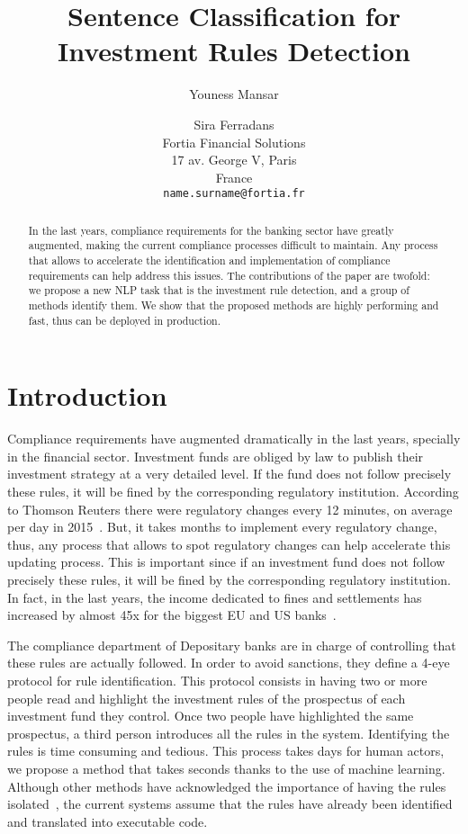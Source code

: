 \documentclass[11pt,a4paper]{article}
\title{Sentence Classification for Investment Rules Detection}
\author{Youness Mansar \and Sira Ferradans \\
  Fortia Financial Solutions   \\
  17 av. George V, Paris \\
  France \\
  {\tt name.surname@fortia.fr} 
  }
\begin{document}
\maketitle

\begin{abstract}
   In the last years, compliance requirements for the banking sector have greatly augmented, making the current compliance processes difficult to maintain. Any process that allows to accelerate the identification and implementation of compliance requirements can help address this issues. The contributions of the paper are twofold: we propose a new NLP task that is the investment rule detection, and a group of methods identify them. We show that the proposed methods are highly performing and fast, thus can be deployed in production.
\end{abstract}

\section{Introduction}

Compliance requirements have augmented dramatically in the last years, specially in the financial sector. Investment funds are obliged by law to publish their investment strategy at a very detailed level. If the fund does not follow precisely these rules, it will be fined by the corresponding regulatory institution. According to Thomson Reuters there were regulatory changes every 12 minutes, on average per day in 2015~\cite{regulatorychanges}. But, it takes months to implement every regulatory change, thus, any process that allows to spot regulatory changes can help accelerate this updating process. This is important since if an investment fund does not follow precisely these rules, it will be fined by the corresponding regulatory institution. In fact, in the last years, the income dedicated to fines and settlements has increased by almost 45x for the biggest EU and US banks~\cite{Kamiski16}.


The compliance department of Depositary banks are in charge of controlling that these rules are actually followed. In order to avoid sanctions, they define a 4-eye protocol for rule identification. This protocol consists in having two or more people read and highlight the investment rules of the prospectus of each investment fund they control. Once two people have highlighted the same prospectus, a third person introduces all the rules in the system. Identifying the rules is time consuming and tedious. This process takes days for human actors, we propose a method that takes seconds thanks to the use of machine learning. Although other methods have acknowledged the importance of having the rules isolated~\cite{cashman2002systeme,beale2004system}, the current systems assume that the rules have already been identified and translated into executable code. 
\end{document}
